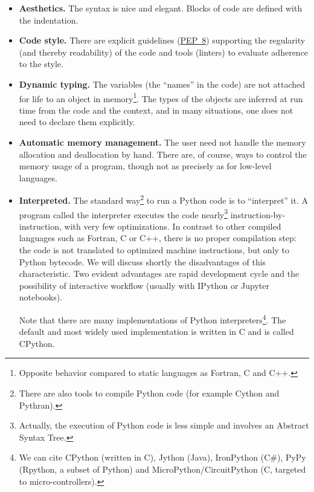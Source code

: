 \begin{itemize}
\item \textbf{Aesthetics.} The syntax is nice and elegant. Blocks of code are
defined with the indentation.
\item \textbf{Code style.} There are explicit guidelines
(\href{https://www.python.org/dev/peps/pep-0008/}{PEP~8}) supporting the
regularity (and thereby readability) of the code and tools
(linters) to evaluate adherence to the style.
\item \textbf{Dynamic typing.} The variables (the ``names'' in the code) are
not attached for life to an object in memory\footnote{Opposite behavior
compared to static languages as Fortran, C and C++.}. The types of the objects
are inferred at run time from the code and the context, and in many situations,
one does not need to declare them explicitly.
%
%
\item \textbf{Automatic memory management.}  The user need not handle the
memory allocation and deallocation by hand.  There are, of course, ways to
control the memory usage of a program, though not as precisely as for low-level
languages.
\item \textbf{Interpreted.} The standard way\footnote{There are also tools to
compile Python code (for example Cython and Pythran).} to run a Python code is
to ``interpret'' it.  A program called the interpreter executes the code
nearly\footnote{Actually, the execution of Python code is less simple and
involves an Abstract Syntax Tree.}  instruction-by-instruction, with very few
optimizations.
%
In contrast to other compiled languages such as Fortran, C or C++, there is no
proper compilation step: the code is not translated to optimized machine
instructions, but only to Python bytecode.
%
We will discuss shortly the disadvantages of this characteristic. Two evident
advantages are rapid development cycle and the possibility of interactive
workflow (usually with IPython or Jupyter notebooks).

Note that there are many implementations of Python interpreters\footnote{We can
cite CPython (written in C), Jython (Java), IronPython (C\#), PyPy (Rpython, a
subset of Python) and MicroPython/CircuitPython (C, targeted to
micro-controllers).}. The default and most widely used implementation is written
in C and is called CPython.


\end{itemize}
